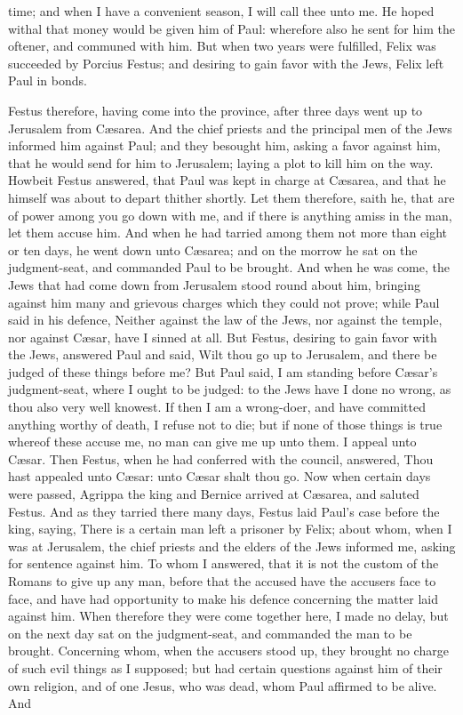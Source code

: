 time; and when I have a convenient season, I will call thee unto me. He hoped withal that money would be given him of Paul: wherefore also he sent for him the oftener, and communed with him. But when two years were fulfilled, Felix was succeeded by Porcius Festus; and desiring to gain favor with the Jews, Felix left Paul in bonds. 

Festus therefore, having come into the province, after three days went up to Jerusalem from Cæsarea. And the chief priests and the principal men of the Jews informed him against Paul; and they besought him, asking a favor against him, that he would send for him to Jerusalem; laying a plot to kill him on the way. Howbeit Festus answered, that Paul was kept in charge at Cæsarea, and that he himself was about to depart thither shortly. Let them therefore, saith he, that are of power among you go down with me, and if there is anything amiss in the man, let them accuse him.  And when he had tarried among them not more than eight or ten days, he went down unto Cæsarea; and on the morrow he sat on the judgment-seat, and commanded Paul to be brought. And when he was come, the Jews that had come down from Jerusalem stood round about him, bringing against him many and grievous charges which they could not prove; while Paul said in his defence, Neither against the law of the Jews, nor against the temple, nor against Cæsar, have I sinned at all. But Festus, desiring to gain favor with the Jews, answered Paul and said, Wilt thou go up to Jerusalem, and there be judged of these things before me? But Paul said, I am standing before Cæsar’s judgment-seat, where I ought to be judged: to the Jews have I done no wrong, as thou also very well knowest. If then I am a wrong-doer, and have committed anything worthy of death, I refuse not to die; but if none of those things is true whereof these accuse me, no man can give me up unto them. I appeal unto Cæsar. Then Festus, when he had conferred with the council, answered, Thou hast appealed unto Cæsar: unto Cæsar shalt thou go.  Now when certain days were passed, Agrippa the king and Bernice arrived at Cæsarea, and saluted Festus. And as they tarried there many days, Festus laid Paul’s case before the king, saying, There is a certain man left a prisoner by Felix; about whom, when I was at Jerusalem, the chief priests and the elders of the Jews informed me, asking for sentence against him. To whom I answered, that it is not the custom of the Romans to give up any man, before that the accused have the accusers face to face, and have had opportunity to make his defence concerning the matter laid against him. When therefore they were come together here, I made no delay, but on the next day sat on the judgment-seat, and commanded the man to be brought. Concerning whom, when the accusers stood up, they brought no charge of such evil things as I supposed; but had certain questions against him of their own religion, and of one Jesus, who was dead, whom Paul affirmed to be alive. And 